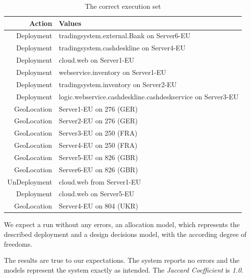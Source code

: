 \begin{table}[h]
	\centering
	\begin{tabular}{r | l}
		\hline
		\textbf{Action} & \textbf{Values}\\
		\hline
		Deployment & tradingsystem.external.Bank on Server6-EU\\
		Deployment & tradingsystem.cashdeskline on Server4-EU\\
		Deployment & cloud.web on Server1-EU\\
		Deployment & webservice.inventory on Server1-EU\\
		Deployment & tradingsystem.inventory on Server2-EU\\
		Deployment & logic.webservice.cashdeskline.cashdeskservice on Server3-EU\\
		GeoLocation & Server1-EU on 276 (GER)\\
		GeoLocation & Server2-EU on 276 (GER)\\
		GeoLocation & Server3-EU on 250 (FRA)\\
		GeoLocation & Server4-EU on 250 (FRA)\\
		GeoLocation & Server5-EU on 826 (GBR)\\
		GeoLocation & Server6-EU on 826 (GBR)\\
		UnDeployment & cloud.web from Server1-EU\\
		Deployment & cloud.web on Server5-EU\\
		GeoLocation & Server4-EU on 804 (UKR)\\
		\hline
		\end{tabular}
	\caption{The correct execution set}
	\label{tab:valid_run}
\end{table}

We expect a run without any errors, an allocation model, which represents the described deployment and a design decisions model, with the according degree of freedoms.

The results are true to our expectations. The system reports no errors and the models represent the system exactly as intended. The \textit{Jaccard Coefficient} is \textit{1.0}.


